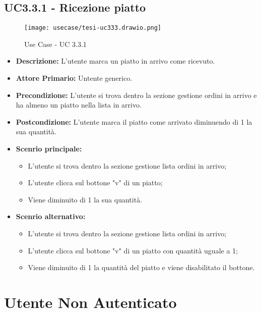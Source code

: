 \subsection{UC3.3.1 - Ricezione piatto}
\begin{figure}[H]
    \centering
    \texttt{[image: usecase/tesi-uc333.drawio.png]}
    \caption{Use Case - UC 3.3.1}
\end{figure}
\begin{itemize}
    \item \textbf{Descrizione:} L'utente marca un piatto in arrivo come ricevuto.
    \item \textbf{Attore Primario:} Untente generico.
    \item \textbf{Precondizione:} L'utente si trova dentro la sezione gestione ordini in arrivo e ha almeno un piatto nella lista in arrivo.
    \item \textbf{Postcondizione:} L'utente marca il piatto come arrivato diminuendo di 1 la sua quantità.
    \item \textbf{Scenrio principale:}
    \begin{itemize}
        \item L'utente si trova dentro la sezione gestione lista ordini in arrivo;
        \item L'utente clicca sul bottone "v" di un piatto;
        \item Viene diminuito di 1 la sua quantità.
    \end{itemize}
    \item \textbf{Scenrio alternativo:}
    \begin{itemize}
        \item L'utente si trova dentro la sezione gestione lista ordini in arrivo;
        \item L'utente clicca sul bottone "v" di un piatto con quantità uguale a 1;
        \item Viene diminuito di 1 la quantità del piatto e viene disabilitato il bottone.
    \end{itemize}
\end{itemize}

\section{Utente Non Autenticato}
